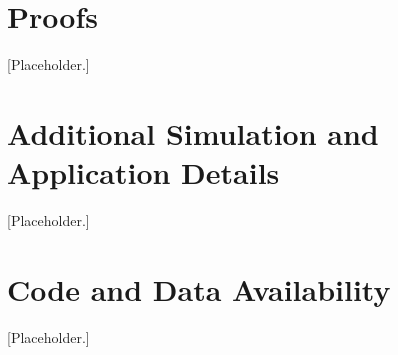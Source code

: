 \documentclass[12pt]{article}
\begin{document}



\begin{appendices}

\section{Proofs}
\label{app:proofs}
[Placeholder.]

\section{Additional Simulation and Application Details}
\label{app:extra}
[Placeholder.]

\section{Code and Data Availability}
\label{app:code}
[Placeholder.]

\end{appendices}
\end{document}
